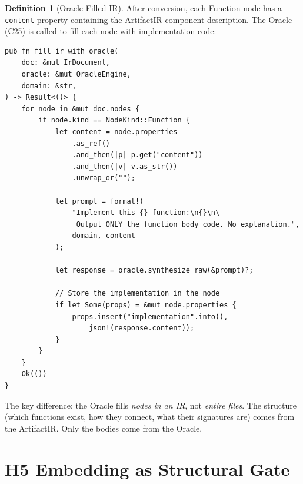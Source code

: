 \documentclass[11pt,a4paper,twoside]{article}
\theoremstyle{definition}
\newtheorem{definition}{Definition}[section]
\theoremstyle{plain}
\theoremstyle{remark}
\begin{document}
\begin{definition}[Oracle-Filled IR]\label{def:oraclefill}
After conversion, each Function node has a \texttt{content} property
containing the ArtifactIR component description. The Oracle (C25)
is called to fill each node with implementation code:
\begin{lstlisting}
pub fn fill_ir_with_oracle(
    doc: &mut IrDocument,
    oracle: &mut OracleEngine,
    domain: &str,
) -> Result<()> {
    for node in &mut doc.nodes {
        if node.kind == NodeKind::Function {
            let content = node.properties
                .as_ref()
                .and_then(|p| p.get("content"))
                .and_then(|v| v.as_str())
                .unwrap_or("");

            let prompt = format!(
                "Implement this {} function:\n{}\n\
                 Output ONLY the function body code. No explanation.",
                domain, content
            );

            let response = oracle.synthesize_raw(&prompt)?;

            // Store the implementation in the node
            if let Some(props) = &mut node.properties {
                props.insert("implementation".into(),
                    json!(response.content));
            }
        }
    }
    Ok(())
}
\end{lstlisting}
The key difference: the Oracle fills \emph{nodes in an IR}, not
\emph{entire files}. The structure (which functions exist, how they
connect, what their signatures are) comes from the ArtifactIR. Only
the bodies come from the Oracle.
\end{definition}


\section{H5 Embedding as Structural Gate}\label{sec:h5}
\end{document}
